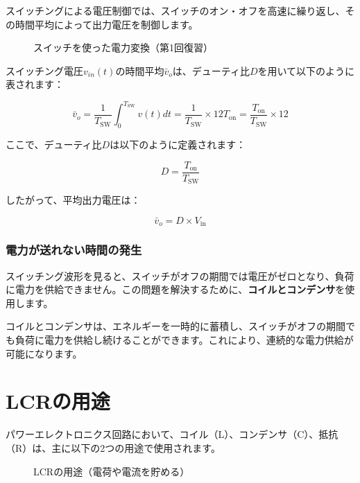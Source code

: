 スイッチングによる電圧制御では、スイッチのオン・オフを高速に繰り返し、その時間平均によって出力電圧を制御します。

\begin{figure}[H]
\centering
{}
\caption{スイッチを使った電力変換（第1回復習）}
\label{fig:ch04_switching_review}
\end{figure}

スイッチング電圧$v_{in}(t)$の時間平均$\bar{v}_o$は、デューティ比$D$を用いて以下のように表されます：

\begin{equation}
\bar{v}_o = \frac{1}{T_{\text{SW}}} \int_0^{T_{\text{SW}}} v(t)dt = \frac{1}{T_{\text{SW}}} \times 12 T_{\text{on}} = \frac{T_{\text{on}}}{T_{\text{SW}}} \times 12
\end{equation}

ここで、デューティ比$D$は以下のように定義されます：

\begin{equation}
D = \frac{T_{\text{on}}}{T_{\text{SW}}}
\end{equation}

したがって、平均出力電圧は：

\begin{equation}
\bar{v}_o = D \times V_{\text{in}}
\end{equation}

\subsubsection{電力が送れない時間の発生}

スイッチング波形を見ると、スイッチがオフの期間では電圧がゼロとなり、負荷に電力を供給できません。この問題を解決するために、\textbf{コイルとコンデンサ}を使用します。

コイルとコンデンサは、エネルギーを一時的に蓄積し、スイッチがオフの期間でも負荷に電力を供給し続けることができます。これにより、連続的な電力供給が可能になります。

\section{LCRの用途}

パワーエレクトロニクス回路において、コイル（L）、コンデンサ（C）、抵抗（R）は、主に以下の2つの用途で使用されます。

\begin{figure}[H]
\centering
{}
\caption{LCRの用途（電荷や電流を貯める）}
\label{fig:ch04_lcr_usage}
\end{figure}

